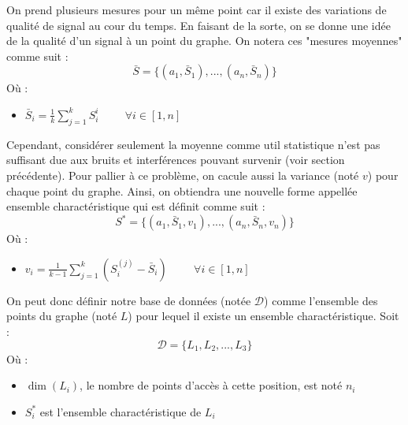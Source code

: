 \documentclass[11pt,journal,compsoc]{IEEEtran}
\begin{document}
        On prend plusieurs mesures pour un même point car il existe des variations de qualité de signal au cour du temps. En faisant de la sorte, on se donne une idée de la qualité d'un signal à un point du graphe. On notera ces "mesures moyennes" comme suit :
        \begin{equation}
          \bar{S} = \{(a_{1}, \bar{S}_{1}), ..., (a_{n}, \bar{S}_{n})\}
        \end{equation}
        Où :
        \begin{itemize}
          \item $\bar{S}_{i} = \frac{1}{k}\sum\limits_{j = 1}^{k} S_{i}^{i} \hspace{1cm} \forall i \in [1, n]$
        \end{itemize}
        Cependant, considérer seulement la moyenne comme util statistique n'est pas suffisant due aux bruits et interférences pouvant survenir (voir section précédente). Pour pallier à ce problème, on cacule aussi la variance (noté $v$) pour chaque point du graphe. Ainsi, on obtiendra une nouvelle forme appellée ensemble charactéristique qui est définit comme suit :
        \begin{equation}
          S^{*} = \{(a_{1}, \bar{S}_{1}, v_{1}), ..., (a_{n}, \bar{S}_{n}, v_{n})\}
        \end{equation}
        Où :
        \begin{itemize}
          \item $v_{i} = \frac{1}{k-1}\sum\limits_{j = 1}^{k}(S_{i}^{(j)}-\bar{S}_{i}) \hspace{1cm} \forall i \in [1,n]$
        \end{itemize}
        On peut donc définir notre base de données (notée $\mathcal{D}$) comme l'ensemble des points du graphe (noté $L$) pour lequel il existe un ensemble charactéristique. Soit : 
        \begin{equation}
          \mathcal{D} = \{L_{1}, L_{2}, ..., L_{3}\}
        \end{equation}
        Où :
        \begin{itemize}
          \item $\dim(L_{i})$, le nombre de points d'accès à cette position, est noté $n_{i}$
          \item $S_{i}^{*}$ est l'ensemble charactéristique de $L_{i}$ 
        \end{itemize}
        
\end{document}
